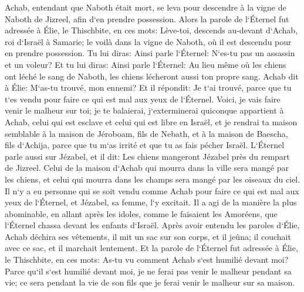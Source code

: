 \verse Achab, entendant que Naboth était mort, se leva pour descendre à la vigne de Naboth de Jizreel, afin d`en prendre possession. 
\verse Alors la parole de l`Éternel fut adressée à Élie, le Thischbite, en ces mots: 
\verse Lève-toi, descends au-devant d`Achab, roi d`Israël à Samarie; le voilà dans la vigne de Naboth, où il est descendu pour en prendre possession. 
\verse Tu lui diras: Ainsi parle l`Éternel: N`es-tu pas un assassin et un voleur? Et tu lui diras: Ainsi parle l`Éternel: Au lieu même où les chiens ont léché le sang de Naboth, les chiens lécheront aussi ton propre sang. 
\verse Achab dit à Élie: M`as-tu trouvé, mon ennemi? Et il répondit: Je t`ai trouvé, parce que tu t`es vendu pour faire ce qui est mal aux yeux de l`Éternel. 
\verse Voici, je vais faire venir le malheur sur toi; je te balaierai, j`exterminerai quiconque appartient à Achab, celui qui est esclave et celui qui est libre en Israël, 
\verse et je rendrai ta maison semblable à la maison de Jéroboam, fils de Nebath, et à la maison de Baescha, fils d`Achija, parce que tu m`as irrité et que tu as fais pécher Israël. 
\verse L`Éternel parle aussi sur Jézabel, et il dit: Les chiens mangeront Jézabel près du rempart de Jizreel. 
\verse Celui de la maison d`Achab qui mourra dans la ville sera mangé par les chiens, et celui qui mourra dans les champs sera mangé par les oiseaux du ciel. 
\verse Il n`y a eu personne qui se soit vendu comme Achab pour faire ce qui est mal aux yeux de l`Éternel, et Jézabel, sa femme, l`y excitait. 
\verse Il a agi de la manière la plus abominable, en allant après les idoles, comme le faisaient les Amoréens, que l`Éternel chassa devant les enfants d`Israël. 
\verse Après avoir entendu les paroles d`Élie, Achab déchira ses vêtements, il mit un sac sur son corps, et il jeûna; il couchait avec ce sac, et il marchait lentement. 
\verse Et la parole de l`Éternel fut adressée à Élie, le Thischbite, en ces mots: 
\verse As-tu vu comment Achab s`est humilié devant moi? Parce qu`il s`est humilié devant moi, je ne ferai pas venir le malheur pendant sa vie; ce sera pendant la vie de son fils que je ferai venir le malheur sur sa maison. 

